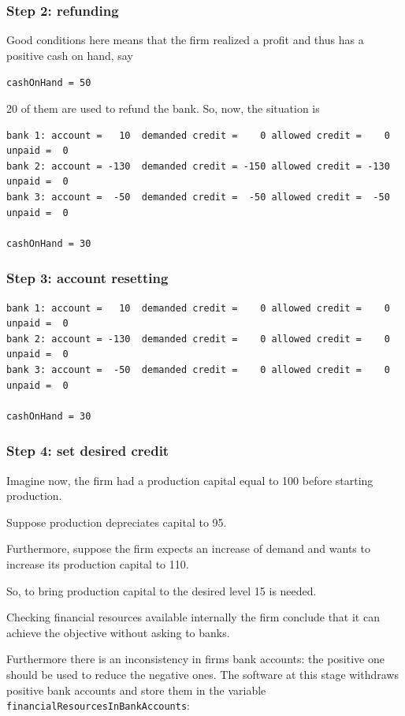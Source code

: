 \documentclass{article}
\begin{document}
	\subsubsection*{Step 2: refunding}
	Good conditions here means that the firm realized a profit and thus has a positive cash on hand, say

	\verb+cashOnHand = 50+

20 of them are used to refund the bank. So, now, the situation is 

\begin{verbatim}
bank 1: account =   10  demanded credit =    0 allowed credit =    0 unpaid =  0
bank 2: account = -130  demanded credit = -150 allowed credit = -130 unpaid =  0
bank 3: account =  -50  demanded credit =  -50 allowed credit =  -50 unpaid =  0

cashOnHand = 30
\end{verbatim}



	\subsubsection*{Step 3: account resetting}

\begin{verbatim}
bank 1: account =   10  demanded credit =    0 allowed credit =    0 unpaid =  0
bank 2: account = -130  demanded credit =    0 allowed credit =    0 unpaid =  0
bank 3: account =  -50  demanded credit =    0 allowed credit =    0 unpaid =  0

cashOnHand = 30
\end{verbatim}

	\subsubsection*{Step 4: set desired credit}
	Imagine now, the firm had a production capital equal to 100 before starting production. 
	
	Suppose production depreciates capital to 95.

	Furthermore, suppose the firm expects an increase of demand and wants to increase its production capital to 110.

	So, to bring production capital to the desired level 15 is needed.

	Checking financial resources available internally the firm conclude that it can achieve the objective without asking to banks. 

	Furthermore there is an inconsistency in firms bank accounts: the positive one should be used to reduce the negative ones. The software at this stage withdraws positive bank accounts and store them in the variable \verb+financialResourcesInBankAccounts+:
\end{document}
